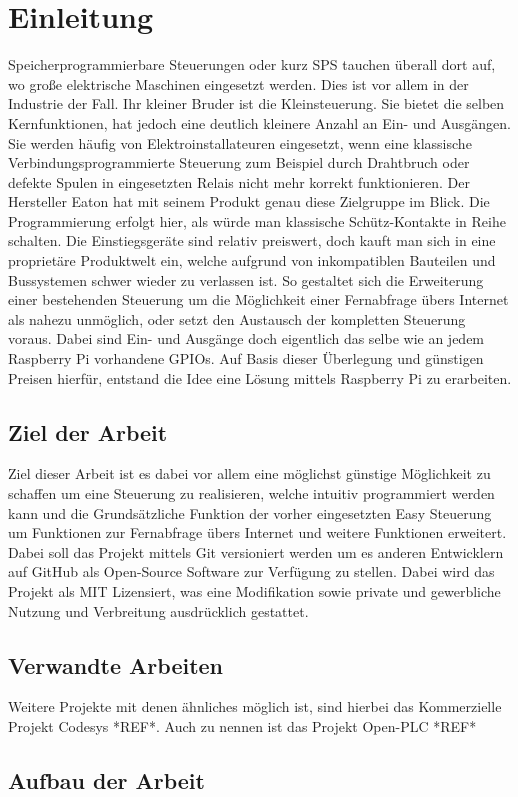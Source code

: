  \section{Einleitung}
 Speicherprogrammierbare Steuerungen oder kurz SPS tauchen überall dort auf, wo große elektrische Maschinen eingesetzt werden. Dies ist vor allem in der Industrie der Fall. Ihr kleiner Bruder ist die Kleinsteuerung. Sie bietet die selben Kernfunktionen, hat jedoch eine deutlich kleinere Anzahl an Ein- und Ausgängen. Sie werden häufig von Elektroinstallateuren eingesetzt, wenn eine klassische Verbindungsprogrammierte Steuerung zum Beispiel durch Drahtbruch oder defekte Spulen in eingesetzten Relais nicht mehr korrekt funktionieren. Der Hersteller Eaton hat mit seinem Produkt  genau diese Zielgruppe im Blick. Die Programmierung erfolgt hier, als würde man klassische Schütz-Kontakte in Reihe schalten. Die Einstiegsgeräte sind relativ preiswert, doch kauft man sich in eine proprietäre Produktwelt ein, welche aufgrund von inkompatiblen Bauteilen und Bussystemen schwer wieder zu verlassen ist. So gestaltet sich die Erweiterung einer bestehenden Steuerung um die Möglichkeit einer Fernabfrage übers Internet als nahezu unmöglich, oder setzt den Austausch der kompletten Steuerung voraus. Dabei sind Ein- und Ausgänge doch eigentlich das selbe wie an jedem Raspberry Pi vorhandene GPIOs. Auf Basis dieser Überlegung und günstigen Preisen hierfür, entstand die Idee eine Lösung mittels Raspberry Pi zu erarbeiten. 
\subsection{Ziel der Arbeit}
Ziel dieser Arbeit ist es dabei vor allem eine möglichst günstige Möglichkeit zu schaffen um eine Steuerung zu realisieren, welche intuitiv programmiert werden kann und die Grundsätzliche Funktion der vorher eingesetzten Easy Steuerung um Funktionen zur Fernabfrage übers Internet und weitere Funktionen erweitert. Dabei soll das Projekt mittels Git versioniert werden um es anderen Entwicklern auf GitHub als Open-Source Software zur Verfügung zu stellen. Dabei wird das Projekt als MIT Lizensiert, was eine Modifikation sowie private und gewerbliche Nutzung und Verbreitung ausdrücklich gestattet. 
\subsection{Verwandte Arbeiten}
Weitere Projekte mit denen ähnliches möglich ist, sind hierbei das Kommerzielle Projekt Codesys *REF*. Auch zu nennen ist das Projekt Open-PLC *REF*   
\subsection{Aufbau der Arbeit}
\clearpage
